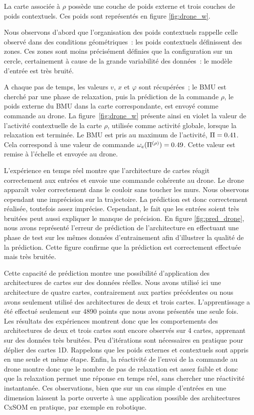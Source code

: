 \documentclass[../main]{subfiles}
\begin{document}
La carte associée à $\rho$ possède une couche de poids externe et trois couches de poids contextuels. 
Ces poids sont représentés en figure \ref{fig:drone_w}. 

Nous observons d'abord que l'organisation des poids contextuels rappelle celle observé dans des conditions géométriques~: les poids contextuels définissent des zones. 
Ces zones sont moins précisément définies que la configuration sur un cercle, certainement à cause de la grande variabilité des données~: le modèle d'entrée est très bruité.

A chaque pas de temps, les valeurs $v$, $x$ et $\varphi$ sont récupérées~; le BMU est cherché par une phase de relaxation, puis la prédiction de la commande $\rho$, le poids externe du BMU dans la carte correspondante, est envoyé comme commande au drone.
La figure~\ref{fig:drone_w} présente ainsi en violet la valeur de l'activité contextuelle de la carte $\rho$, utilisée comme activité globale, lorsque la relaxation est terminée. Le BMU est pris au maximum de l'activité, $\Pi = 0.41$. Cela correspond à une valeur de commande $\omega_e(\Pi^{({\rho})}) = 0.49$. Cette valeur est remise à l'échelle et envoyée au drone.

L'expérience en temps réel montre que l'architecture de cartes réagit correctement aux entrées et envoie une commande cohérente au drone. Le drone apparaît voler correctement dans le couloir sans toucher les murs. Nous observons cependant une imprécision sur la trajectoire. La prédiction est donc correctement réalisée, toutefois assez imprécise. Cependant, le fait que les entrées soient très bruitées peut aussi expliquer le manque de précision. 
En figure \ref{fig:pred_drone}, nous avons représenté l'erreur de prédiction de l'architecture en effectuant une phase de test sur les mêmes données d'entrainement afin d'illustrer la qualité de la prédiction. Cette figure confirme que la prédiction est correctement effectuée mais très bruitée.

Cette capacité de prédiction montre une possibilité d'application des architectures de cartes sur des données réelles. Nous avons utilisé ici une architecture de quatre cartes, contrairement aux parties précédentes ou nous avons seulement utilisé des architectures de deux et trois cartes. 
L'apprentissage a été effectué seulement sur 4890 points que nous avons présentés une seule fois.
Les résultats des expériences montrent donc que les comportements des architectures de deux et trois cartes sont encore observés sur 4 cartes, apprenant sur des données très bruitées.
Peu d'itérations sont nécessaires en pratique pour déplier des cartes 1D. Rappelons que les poids externes et contextuels sont appris en une seule et même étape.
Enfin, la réactivité de l'envoi de la commande au drone montre donc que le nombre de pas de relaxation est assez faible et donc que la relaxation permet une réponse en temps réel, sans chercher une réactivité instantanée.
Ces observations, bien que sur un cas simple d'entrées en une dimension laissent la porte ouverte à une application possible des architectures CxSOM en pratique, par exemple en robotique.
\end{document}
